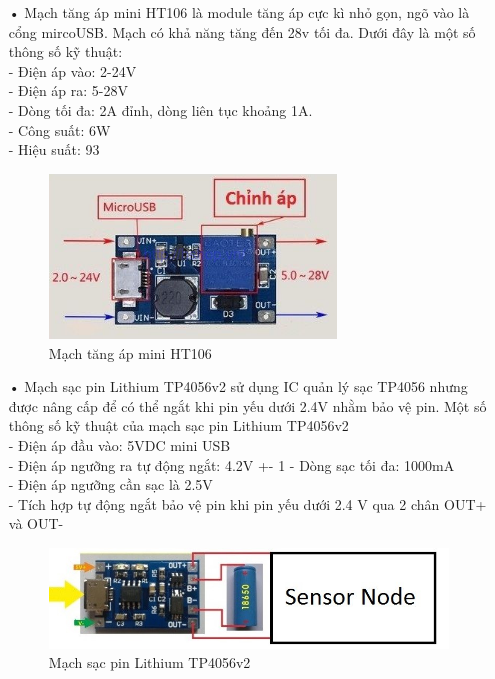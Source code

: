 \begin{itemize}
\item[•]Mạch tăng áp mini HT106 là module tăng áp cực kì nhỏ gọn, ngõ vào là cổng mircoUSB. Mạch có khả năng tăng đến 28v tối đa. Dưới đây là một số thông số kỹ thuật:\\
-	Điện áp vào: 2-24V\\
-	Điện áp ra: 5-28V\\
-	Dòng tối đa: 2A đỉnh, dòng liên tục khoảng 1A.\\
-	Công suất: 6W\\
-	Hiệu suất: 93%
	\begin{figure}[H]
	\centering    
	\includegraphics[width=3in]{ht06}
	\caption[Mạch tăng áp mini HT106]{Mạch tăng áp mini HT106}
	\label{fig:ht06}
	\end{figure}

\item[•]Mạch sạc pin Lithium TP4056v2 sử dụng IC quản lý sạc TP4056 nhưng được nâng cấp để có thể ngắt khi pin yếu dưới 2.4V nhằm bảo vệ pin. Một số thông số kỹ thuật của mạch sạc pin Lithium TP4056v2\\
-	Điện áp đầu vào: 5VDC mini USB\\
-	Điện áp ngưỡng ra tự động ngắt: 4.2V +- 1%
-	Dòng sạc tối đa: 1000mA\\
-	Điện áp ngưỡng cần sạc là 2.5V\\
-	Tích hợp tự động ngắt bảo vệ pin khi pin yếu dưới 2.4 V qua 2 chân OUT+ và OUT-
	\begin{figure}[H]
	\centering    
	\includegraphics[width=5in]{tp4056}
	\caption[Mạch sạc pin Lithium TP4056v2]{Mạch sạc pin Lithium TP4056v2}
	\label{fig:tp4056}
	\end{figure}






\end{itemize}
